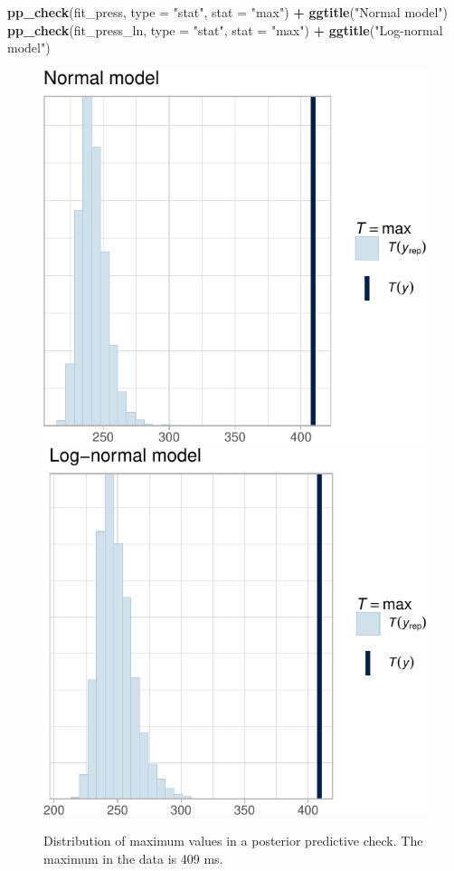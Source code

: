 \documentclass[12pt,ignorenonframetext,aspectratio=169]{beamer}
\newenvironment{Shaded}{\begin{snugshade}}{\end{snugshade}}
\newcommand{\DataTypeTok}[1]{\textcolor[rgb]{0.13,0.29,0.53}{#1}}
\newcommand{\KeywordTok}[1]{\textcolor[rgb]{0.13,0.29,0.53}{\textbf{#1}}}
\newcommand{\NormalTok}[1]{#1}
\newcommand{\OperatorTok}[1]{\textcolor[rgb]{0.81,0.36,0.00}{\textbf{#1}}}
\newcommand{\StringTok}[1]{\textcolor[rgb]{0.31,0.60,0.02}{#1}}
\begin{document}
\begin{frame}[fragile]

\vspace{.1in}

\scriptsize

\begin{Shaded}
\begin{Highlighting}[]
\KeywordTok{pp_check}\NormalTok{(fit_press, }\DataTypeTok{type =} \StringTok{"stat"}\NormalTok{, }\DataTypeTok{stat =} \StringTok{"max"}\NormalTok{) }\OperatorTok{+}
\StringTok{  }\KeywordTok{ggtitle}\NormalTok{(}\StringTok{"Normal model"}\NormalTok{)}
\KeywordTok{pp_check}\NormalTok{(fit_press_ln, }\DataTypeTok{type =} \StringTok{"stat"}\NormalTok{, }\DataTypeTok{stat =} \StringTok{"max"}\NormalTok{) }\OperatorTok{+}
\StringTok{  }\KeywordTok{ggtitle}\NormalTok{(}\StringTok{"Log-normal model"}\NormalTok{)}
\end{Highlighting}
\end{Shaded}

\begin{figure}
\includegraphics[width=0.45\linewidth]{03-compbayes-slides_files/figure-beamer/ppcheckmax-1} \includegraphics[width=0.45\linewidth]{03-compbayes-slides_files/figure-beamer/ppcheckmax-2} \caption{Distribution of maximum values in a posterior predictive check. The maximum in the data is 409 ms.}\label{fig:ppcheckmax}
\end{figure}

\normalsize

\end{frame}
\end{document}
